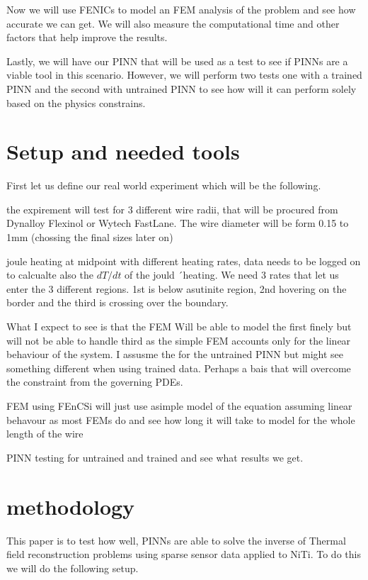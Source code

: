 \documentclass[12pt, a4paper]{article}
\begin{document}
Now we will use FENICs to model an FEM analysis of the problem and see how accurate we can get. We will also measure the computational time and other factors that help improve the results. 

Lastly, we will have our PINN that will be used as a test to see if PINNs are a viable tool in this scenario. However, we will perform two tests one with a trained PINN and the second with untrained PINN to see how will it can perform solely based on the physics constrains.

\section{Setup and needed tools}   

First let us define our real world experiment which will be the following. 

the expirement will test for 3 different wire radii, that will be procured from Dynalloy Flexinol or Wytech FastLane. The wire diameter will be form 0.15 to 1mm (chossing the final sizes later on)

joule heating at midpoint with different heating rates, data needs to be logged on to calcualte also the $dT/dt$ of the jould ´heating. We need 3 rates that let us enter the 3 different regions. 1st is below asutinite region, 2nd hovering on the border and the third is crossing over the boundary. 

What I expect to see is that the FEM Will be able to model the first finely but will not be able to handle third as the simple FEM accounts only for the linear behaviour of the system. I assusme the for the untrained PINN but might see something different when using trained data. Perhaps a bais that will overcome the constraint from the governing PDEs. 

FEM using FEnCSi will just use  asimple model of the equation assuming linear behavour as most FEMs do and see how long it will take to model for the whole length of the wire

PINN testing for untrained and trained and see what results we get. 



\section{methodology}
This paper is to test how well, PINNs are able to solve the inverse of Thermal field reconstruction problems using sparse sensor data applied to NiTi. To do this we will do the following setup. 
\end{document}
